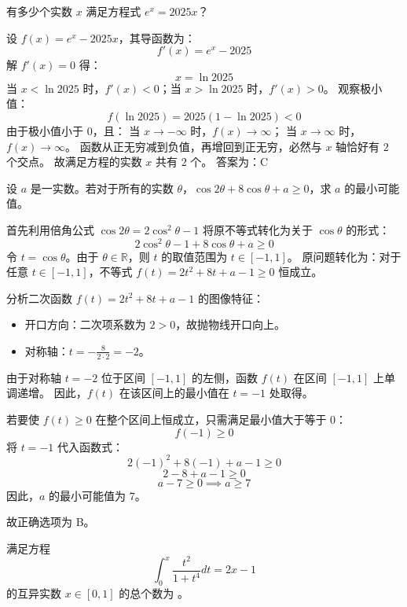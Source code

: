 \begin{questions}
\question 有多少个实数 $x$ 满足方程式 $e^{x} = 2025x$？

\begin{solution}
设 $f(x) = e^{x} - 2025x$，其导函数为：
\[
f'(x) = e^{x} - 2025
\]
解 $f'(x) = 0$ 得：
\[
x = \ln 2025
\]
当 $x < \ln 2025$ 时，$f'(x) < 0$；当 $x > \ln 2025$ 时，$f'(x) > 0$。
观察极小值：
\[
f(\ln 2025) = 2025(1 - \ln 2025) < 0
\]
由于极小值小于 $0$，且：
当 $x \to -\infty$ 时，$f(x) \to \infty$；
当 $x \to \infty$ 时，$f(x) \to \infty$。
函数从正无穷减到负值，再增回到正无穷，必然与 $x$ 轴恰好有 $2$ 个交点。
故满足方程的实数 $x$ 共有 $2$ 个。
答案为：C
\end{solution}

\question 设 $a$ 是一实数。若对于所有的实数 $\theta$，$\cos 2\theta + 8 \cos \theta + a \ge 0$，求 $a$ 的最小可能值。

\begin{solution}
首先利用倍角公式 $\cos 2\theta = 2\cos^2 \theta - 1$ 将原不等式转化为关于 $\cos \theta$ 的形式：
\[
2\cos^2 \theta - 1 + 8 \cos \theta + a \ge 0
\]
令 $t = \cos \theta$。由于 $\theta \in \mathbb{R}$，则 $t$ 的取值范围为 $t \in [-1, 1]$。
原问题转化为：对于任意 $t \in [-1, 1]$，不等式 $f(t) = 2t^2 + 8t + a - 1 \ge 0$ 恒成立。

分析二次函数 $f(t) = 2t^2 + 8t + a - 1$ 的图像特征：
\begin{itemize}
    \item 开口方向：二次项系数为 $2 > 0$，故抛物线开口向上。
    \item 对称轴：$t = - \frac{8}{2 \cdot 2} = -2$。
\end{itemize}
由于对称轴 $t = -2$ 位于区间 $[-1, 1]$ 的左侧，函数 $f(t)$ 在区间 $[-1, 1]$ 上单调递增。
因此，$f(t)$ 在该区间上的最小值在 $t = -1$ 处取得。

若要使 $f(t) \ge 0$ 在整个区间上恒成立，只需满足最小值大于等于 0：
\[
f(-1) \ge 0
\]
将 $t = -1$ 代入函数式：
\[
2(-1)^2 + 8(-1) + a - 1 \ge 0
\]
\[
2 - 8 + a - 1 \ge 0
\]
\[
a - 7 \ge 0 \implies a \ge 7
\]
因此，$a$ 的最小可能值为 $7$。

故正确选项为 B。
\end{solution}

\question 满足方程
\[
\int_{0}^{x} \frac{t^2}{1+t^4} dt = 2x - 1
\]
的互异实数 $x \in [0, 1]$ 的总个数为 \underline{\hspace{1cm}}。


\end{questions}

